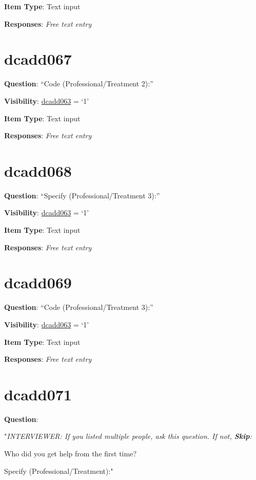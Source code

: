 \documentclass[]{book}
\begin{document}
\textbf{Item Type}: Text input

\textbf{Responses}: \emph{Free text entry}

\hypertarget{dcadd067}{%
\section{dcadd067}\label{dcadd067}}

\textbf{Question}: ``Code (Professional/Treatment 2):''

\textbf{Visibility}: \protect\hyperlink{dcadd063}{dcadd063} = `1'

\textbf{Item Type}: Text input

\textbf{Responses}: \emph{Free text entry}

\hypertarget{dcadd068}{%
\section{dcadd068}\label{dcadd068}}

\textbf{Question}: ``Specify (Professional/Treatment 3):''

\textbf{Visibility}: \protect\hyperlink{dcadd063}{dcadd063} = `1'

\textbf{Item Type}: Text input

\textbf{Responses}: \emph{Free text entry}

\hypertarget{dcadd069}{%
\section{dcadd069}\label{dcadd069}}

\textbf{Question}: ``Code (Professional/Treatment 3):''

\textbf{Visibility}: \protect\hyperlink{dcadd063}{dcadd063} = `1'

\textbf{Item Type}: Text input

\textbf{Responses}: \emph{Free text entry}

\hypertarget{dcadd071}{%
\section{dcadd071}\label{dcadd071}}

\textbf{Question}:

"\emph{INTERVIEWER: If you listed multiple people, ask this question. If not, \textbf{Skip}:}

Who did you get help from the first time?

Specify (Professional/Treatment):"
\end{document}
